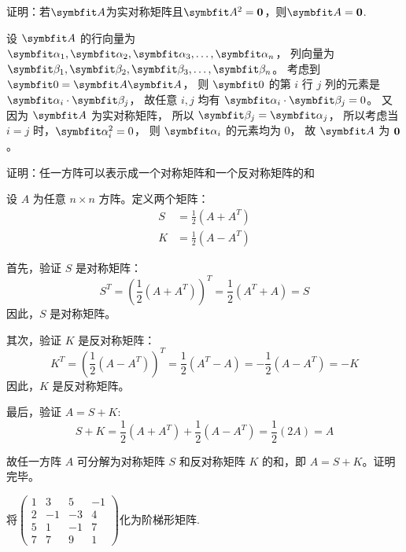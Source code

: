 \begin{example}{}{}
    证明：若$\bv{A}$为实对称矩阵且$\bv{A}^2=\bf{0}$，则$\bv{A}=\bf{0}$.
\end{example}
\begin{solution}
设 $\bv{A}$ 的行向量为 $\bv{\alpha}_1, \bv{\alpha}_2, \bv{\alpha}_3, \dots, \bv{\alpha}_n$，
列向量为 $\bv{\beta}_1, \bv{\beta}_2, \bv{\beta}_3, \dots, \bv{\beta}_n$。
考虑到 $\bv{0} = \bv{A}\bv{A}$，
则 $\bv{0}$ 的第 $i$ 行 $j$ 列的元素是 $\bv{\alpha}_i \cdot \bv{\beta}_j$，
故任意 $i,j$ 均有 $\bv{\alpha}_i \cdot \bv{\beta}_j = 0$。
又因为 $\bv{A}$ 为实对称矩阵，
所以 $\bv{\beta}_j = \bv{\alpha}_j$，
所以考虑当 $i=j$ 时，$\bv{\alpha}_i^2 = 0$，
则 $\bv{\alpha}_i$ 的元素均为 $0$，
故 $\bv{A}$ 为 $\bf{0}$。
\end{solution}
\begin{example}{}{}
    证明：任一方阵可以表示成一个对称矩阵和一个反对称矩阵的和
\end{example}
\begin{solution}
    设 \( A \) 为任意 \( n \times n \) 方阵。定义两个矩阵：
\begin{align}
S &= \frac{1}{2} (A + A^T) \\
K &= \frac{1}{2} (A - A^T)
\end{align}

\noindent 首先，验证 \( S \) 是对称矩阵：
\[
S^T = \left( \frac{1}{2} (A + A^T) \right)^T = \frac{1}{2} (A^T + A) = S
\]
因此，\( S \) 是对称矩阵。

\noindent 其次，验证 \( K \) 是反对称矩阵：
\[
K^T = \left( \frac{1}{2} (A - A^T) \right)^T = \frac{1}{2} (A^T - A) = -\frac{1}{2} (A - A^T) = -K
\]
因此，\( K \) 是反对称矩阵。

\noindent 最后，验证 \( A = S + K \):
\[
S + K = \frac{1}{2} (A + A^T) + \frac{1}{2} (A - A^T) = \frac{1}{2} (2A) = A
\]

故任一方阵 \( A \) 可分解为对称矩阵 \( S \) 和反对称矩阵 \( K \) 的和，即 \( A = S + K \)。证明完毕。
\end{solution}
\begin{example}{}{}
    将$\begin{pmatrix}1&3&5&-1\\2&-1&-3&4\\5&1&-1&7\\7&7&9&1\end{pmatrix}$化为阶梯形矩阵.
\end{example}
